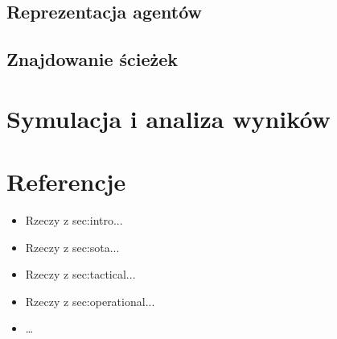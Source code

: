\documentclass[a4paper, 12pt]{article}
\begin{document}

        \subsection{Reprezentacja agentów}
        \label{sec:actor-impl}


        \subsection{Znajdowanie ścieżek}
        \label{sec:path-finding}


\newpage
    \section{Symulacja i analiza wyników}
    \label{sec:sota}


\newpage
    \section{Referencje}
    \label{sec:refs}


    \begin{itemize}
        \begin{item} \label{refs:social-distances-1} Social Distances \end{item}
        \item Rzeczy z sec:intro...
        \item Rzeczy z sec:sota...
        \item Rzeczy z sec:tactical...
        \item Rzeczy z sec:operational...
        \item \ldots
    \end{itemize}
\end{document}
